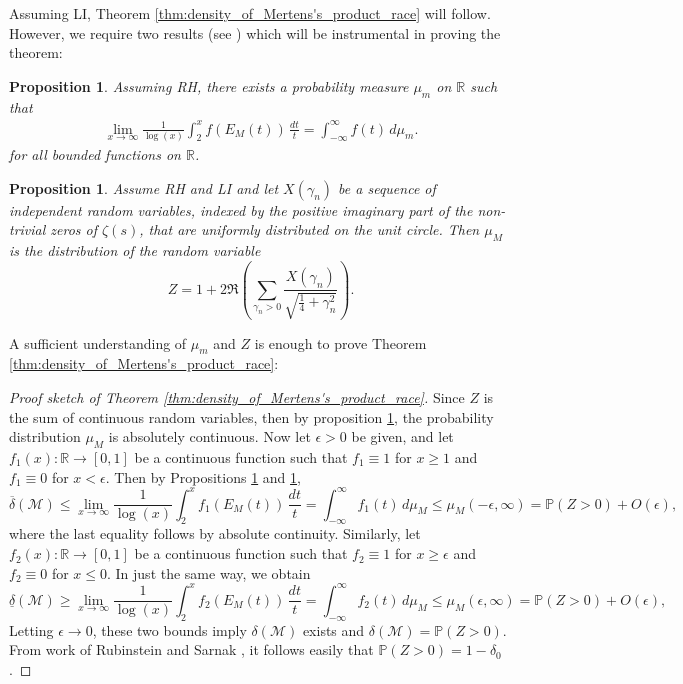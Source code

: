 \documentclass[12pt,reqno]{amsart}
\newtheorem{proposition}[theorem]{Proposition}
\theoremstyle{definition}
\numberwithin{equation}{section}
\newcommand{\R}{{\mathbb R}}
\begin{document}
Assuming LI, Theorem \ref{thm:density_of_Mertens's_product_race} will follow. However, we require two results (see \cite{La}) which will be instrumental in proving the theorem:

\begin{proposition}\label{prop:limiting_distribution_exists}
    Assuming RH, there exists a probability measure $\mu_{m}$ on $\R$ such that 
    \begin{align*}
        \lim_{x \to \infty}\frac{1}{\log(x)}\int_{2}^{x}f(E_M(t))\,\frac{dt}{t} = \int_{-\infty}^{\infty}f(t)\,d\mu_{m}.
    \end{align*} 
for all bounded functions on $\R$.
\end{proposition}

\begin{proposition}\label{prop:Z_random_variable_distribution}
    Assume RH and LI and let $X(\gamma_{n})$ be a sequence of independent random variables, indexed by the positive imaginary part of the non-trivial zeros of $\zeta(s)$, that are uniformly distributed on the unit circle. Then $\mu_M$ is the distribution of the random variable
    \[
        Z = 1+2\Re\left(\sum_{\gamma_{n} >0} \frac{X(\gamma_{n})}{\sqrt{\frac{1}{4}+ \gamma_{n}^{2}}}\right).
    \]
\end{proposition} 

A sufficient understanding of $\mu_{m}$ and $Z$ is enough to prove Theorem \ref{thm:density_of_Mertens's_product_race}:

\begin{proof}[Proof sketch of Theorem \ref{thm:density_of_Mertens's_product_race}]
    Since $Z$ is the sum of continuous random variables, then by proposition \ref{prop:Z_random_variable_distribution}, the probability distribution $\mu_M$ is absolutely continuous. Now let $\epsilon >0$ be given, and let $f_{1}(x)\colon\R \to [0,1]$ be a continuous function such that $f_{1} \equiv 1$ for $x \ge 1$ and $f_{1} \equiv 0$ for $x < \epsilon$. Then by Propositions \ref{prop:limiting_distribution_exists} and \ref{prop:Z_random_variable_distribution}, 
    \[
        \overline{\delta}(\mathcal{M}) \le \lim_{x \to \infty}\frac{1}{\log(x)}\int_{2}^{x}f_{1}(E_{M}(t))\,\frac{dt}{t} = \int_{-\infty}^{\infty}f_{1}(t)\,d\mu_{M} \le \mu_{M}(-\epsilon,\infty) = \mathbb{P}(Z > 0)+O(\epsilon),
    \]
    where the last equality follows by absolute continuity. Similarly, let $f_{2}(x)\colon\R \to [0,1]$ be a continuous function such that $f_{2} \equiv 1$ for $x \ge \epsilon$ and $f_{2} \equiv 0$ for $x \le 0$. In just the same way, we obtain
    \[
        \underline{\delta}(\mathcal{M}) \ge \lim_{x \to \infty}\frac{1}{\log(x)}\int_{2}^{x}f_{2}(E_{M}(t))\,\frac{dt}{t} = \int_{-\infty}^{\infty}f_{2}(t)\,d\mu_{M} \le \mu_{M}(\epsilon,\infty) = \mathbb{P}(Z > 0)+O(\epsilon),
    \]
    Letting $\epsilon \to 0$, these two bounds imply $\delta(\mathcal{M})$ exists and $\delta(\mathcal{M}) = \mathbb{P}(Z > 0)$. From work of Rubinstein and Sarnak \cite{RS}, it follows easily that $\mathbb{P}(Z > 0) = 1-\delta_{0}$.
\end{proof}
\end{document}
